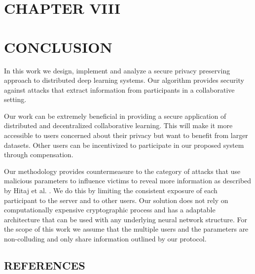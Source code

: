 \documentclass[letterpaper]{article}
\begin{document}
\begin{flushleft}
{\pagebreak
\section*{CHAPTER VIII}
\vspace{0.25in}
\section{CONCLUSION}

In this work we design, implement and analyze a secure privacy preserving approach to distributed deep learning systems.  Our
algorithm provides security against attacks that extract information from participants in a collaborative setting. 

Our work can be extremely beneficial in providing a secure application of distributed and decentralized collaborative learning. This
will make it more accessible to users concerned about their privacy but want to benefit from larger datasets. Other users can be incentivized to participate in our proposed system through compensation.

Our methodology provides countermeasure to the category of attacks that use malicious parameters to influence victims to reveal more
information as described  by Hitaj  et al. \cite{hitaj2017deep} . We do this by limiting the consistent exposure of each participant to
the server and to other users. Our solution does not rely on computationally expensive cryptographic process and has a adaptable
architecture that can be used with any underlying neural network structure. For the scope of this work we assume that the multiple
users and the parameters are non-colluding and only share information outlined by our protocol. 

\newpage

\begin{center}
\vspace*{\fill}
\section*{\normalfont REFERENCES}
\vspace*{\fill}
\end{center}

\newpage



}

\end{flushleft}
\end{document}
